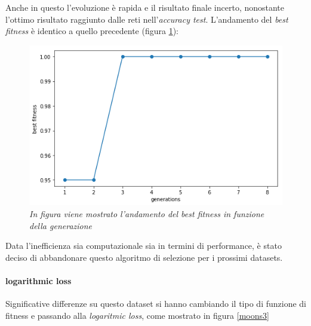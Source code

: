 \documentclass[12pt,a4paper]{report}
\begin{document}
Anche in questo l'evoluzione è rapida e il risultato finale incerto, nonostante l'ottimo risultato raggiunto dalle reti nell'\textit{accuracy test}. L'andamento del \textit{best fitness} è identico a quello precedente (figura \ref{best2}):

\begin{figure}[H]
 \centering
 \includegraphics[scale = 0.4]{images/moons-sons-acc./best}
 \caption{\textit{In figura viene mostrato l'andamento del best fitness in funzione della generazione}}
 \label{best2}
\end{figure}

Data l'inefficienza sia computazionale sia in termini di performance, è stato deciso di abbandonare questo algoritmo di selezione per i prossimi datasets.

\paragraph{logarithmic loss}

Significative differenze su questo dataset si hanno cambiando il tipo di funzione di fitness e passando alla \textit{logaritmic loss}, come mostrato in figura \ref{moons3}
\end{document}
